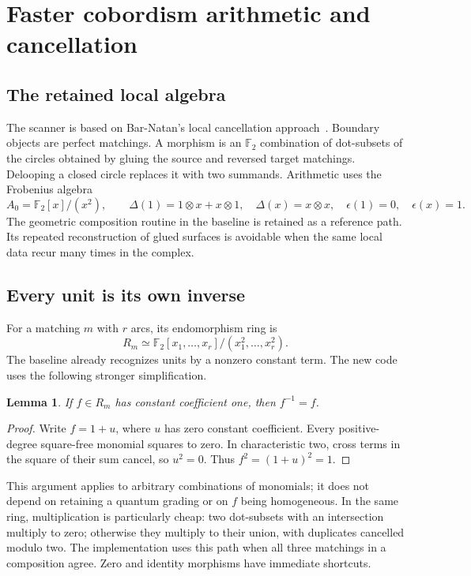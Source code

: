 \documentclass[11pt,letterpaper]{article}
\newtheorem{lemma}[theorem]{Lemma}
\theoremstyle{definition}\newtheorem{definition}[theorem]{Definition}
\theoremstyle{remark}\newtheorem{remark}[theorem]{Remark}
\newcommand{\F}{\mathbb F}
\begin{document}
\section{Faster cobordism arithmetic and cancellation}

\subsection{The retained local algebra}

The scanner is based on Bar-Natan's local cancellation approach~\cite{bn}.
Boundary objects are perfect matchings. A morphism is an $\F_2$ combination of
dot-subsets of the circles obtained by gluing the source and reversed target
matchings. Delooping a closed circle replaces it with two summands. Arithmetic
uses the Frobenius algebra
\[
 A_0=\F_2[x]/(x^2),\qquad
 \Delta(1)=1\otimes x+x\otimes1,\quad \Delta(x)=x\otimes x,
 \quad \epsilon(1)=0,\quad\epsilon(x)=1.
\]
The geometric composition routine in the baseline is retained as a reference
path. Its repeated reconstruction of glued surfaces is avoidable when the same
local data recur many times in the complex.

\subsection{Every unit is its own inverse}

For a matching $m$ with $r$ arcs, its endomorphism ring is
\[
 R_m\simeq\F_2[x_1,\ldots,x_r]/(x_1^2,\ldots,x_r^2).
\]
The baseline already recognizes units by a nonzero constant term. The new code
uses the following stronger simplification.

\begin{lemma}\label{lem:inverse}
If $f\in R_m$ has constant coefficient one, then $f^{-1}=f$.
\end{lemma}
\begin{proof}
Write $f=1+u$, where $u$ has zero constant coefficient. Every positive-degree
square-free monomial squares to zero. In characteristic two, cross terms in the
square of their sum cancel, so $u^2=0$. Thus $f^2=(1+u)^2=1$.
\end{proof}

This argument applies to arbitrary combinations of monomials; it does not depend
on retaining a quantum grading or on $f$ being homogeneous. In the same ring,
multiplication is particularly cheap: two dot-subsets with an intersection
multiply to zero; otherwise they multiply to their union, with duplicates
cancelled modulo two. The implementation uses this path when all three
matchings in a composition agree. Zero and identity morphisms have immediate
shortcuts.
\end{document}

